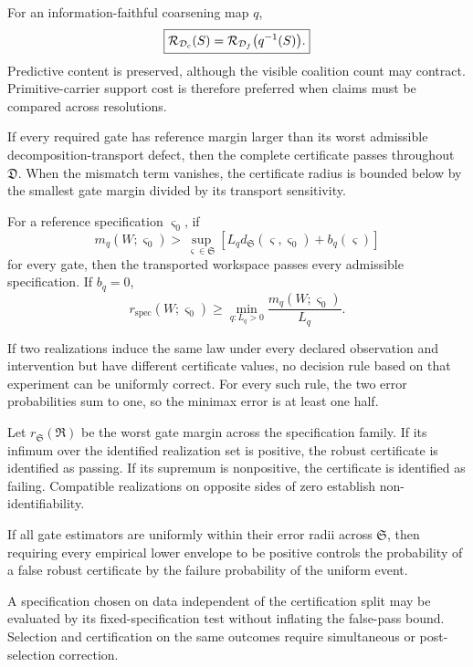 For an information-faithful coarsening map \(q\),
\[
\boxed{
\mathcal R_{\mathcal D_c}(S)
=
\mathcal R_{\mathcal D_f}\bigl(q^{-1}(S)\bigr).
}
\]
Predictive content is preserved, although the visible coalition count may
contract. Primitive-carrier support cost is therefore preferred when claims
must be compared across resolutions.

If every required gate has reference margin larger than its worst admissible
decomposition-transport defect, then the complete certificate passes
throughout \(\mathfrak D\). When the mismatch term vanishes, the certificate
radius is bounded below by the smallest gate margin divided by its transport
sensitivity.

For a reference specification \(\varsigma_0\), if
\[
m_q(W;\varsigma_0)
>
\sup_{\varsigma\in\mathfrak S}
\left[
L_qd_{\mathfrak S}(\varsigma,\varsigma_0)+b_q(\varsigma)
\right]
\]
for every gate, then the transported workspace passes every admissible
specification. If \(b_q=0\),
\[
r_{\mathrm{spec}}(W;\varsigma_0)
\geq
\min_{q:L_q>0}\frac{m_q(W;\varsigma_0)}{L_q}.
\]

If two realizations induce the same law under every declared observation and
intervention but have different certificate values, no decision rule based on
that experiment can be uniformly correct. For every such rule, the two error
probabilities sum to one, so the minimax error is at least one half.

Let \(r_{\mathfrak S}(\mathfrak R)\) be the worst gate margin across the
specification family. If its infimum over the identified realization set is
positive, the robust certificate is identified as passing. If its supremum is
nonpositive, the certificate is identified as failing. Compatible realizations
on opposite sides of zero establish non-identifiability.

If all gate estimators are uniformly within their error radii across
\(\mathfrak S\), then requiring every empirical lower envelope to be positive
controls the probability of a false robust certificate by the failure
probability of the uniform event.

A specification chosen on data independent of the certification split may be
evaluated by its fixed-specification test without inflating the false-pass
bound. Selection and certification on the same outcomes require simultaneous
or post-selection correction.
